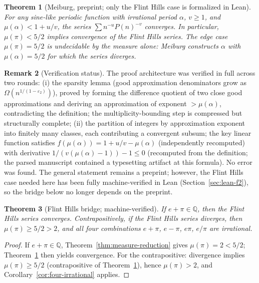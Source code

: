 \documentclass[11pt]{amsart}
\newtheorem{theorem}{Theorem}[section]
\theoremstyle{definition}
\newtheorem{remark}[theorem]{Remark}
\theoremstyle{remark}
\numberwithin{equation}{section}
\newcommand{\Q}{\mathbb{Q}}
\newcommand{\irr}{\mu}
\begin{document}
\begin{theorem}[Meiburg, preprint; only the Flint Hills case is formalized in Lean]\label{thm:meiburg}
For any sine-like periodic function with irrational period $\alpha$, $v\ge1$, and $\irr(\alpha)<1+u/v$, the series $\sum n^{-u}P(n)^{-v}$ converges. In particular, $\irr(\pi)<5/2$ implies convergence of the Flint Hills series. The edge case $\irr(\pi)=5/2$ is undecidable by the measure alone: Meiburg constructs $\alpha$ with $\irr(\alpha)=5/2$ for which the series diverges.
\end{theorem}

\begin{remark}[Verification status]
The proof architecture was verified in full across two rounds: (i) the sparsity lemma (good approximation denominators grow as $\Omega(n^{1/(1-\varepsilon_2)})$), proved by forming the difference quotient of two close good approximations and deriving an approximation of exponent $>\irr(\alpha)$, contradicting the definition; the multiplicity-bounding step is compressed but structurally complete; (ii) the partition of integers by approximation exponent into finitely many classes, each contributing a convergent subsum; the key linear function satisfies $f(\irr(\alpha))=1+u/v-\irr(\alpha)$ (independently recomputed) with derivative $1/(v(\irr(\alpha)-1))-1\le0$ (recomputed from the definition; the parsed manuscript contained a typesetting artifact at this formula). No error was found. The general statement remains a preprint; however, the Flint Hills case needed here has been fully machine-verified in Lean (Section~\ref{sec:lean-f2}), so the bridge below no longer depends on the preprint.
\end{remark}

\begin{theorem}[Flint Hills bridge; machine-verified]\label{thm:flint}
If $e+\pi\in\Q$, then the Flint Hills series converges. Contrapositively, if the Flint Hills series diverges, then $\irr(\pi)\ge5/2>2$, and all four combinations $e+\pi$, $e-\pi$, $e\pi$, $e/\pi$ are irrational.
\end{theorem}

\begin{proof}
If $e+\pi\in\Q$, Theorem~\ref{thm:measure-reduction} gives $\irr(\pi)=2<5/2$; Theorem~\ref{thm:meiburg} then yields convergence. For the contrapositive: divergence implies $\irr(\pi)\ge5/2$ (contrapositive of Theorem~\ref{thm:meiburg}), hence $\irr(\pi)>2$, and Corollary~\ref{cor:four-irrational} applies.
\end{proof}
\end{document}
